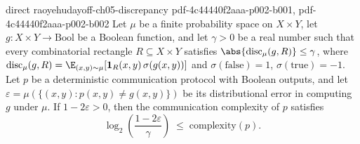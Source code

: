 \begin{theorem}
  {direct}
  {raoyehudayoff-ch05-discrepancy}
  {pdf-4c44440f2aaa-p002-b001,
    pdf-4c44440f2aaa-p002-b002}
Let $\mu$ be a finite probability space on $X \times Y$, let $g : X \times Y \to
\mathrm{Bool}$ be a Boolean function, and let $\gamma > 0$ be a real number such that
every combinatorial rectangle $R \subseteq X \times Y$ satisfies
$\abs{\mathrm{disc}_\mu(g, R)} \le \gamma$, where $\mathrm{disc}_\mu(g, R) =
\E_{(x,y)\sim\mu}[\mathbf{1}_R(x,y)\,\sigma(g(x,y))]$ and $\sigma(\mathrm{false}) = 1$,
$\sigma(\mathrm{true}) = -1$. Let $p$ be a deterministic communication protocol with
Boolean outputs, and let $\varepsilon = \mu(\{(x,y) : p(x,y) \ne g(x,y)\})$ be its
distributional error in computing $g$ under $\mu$. If $1 - 2\varepsilon > 0$, then the
communication complexity of $p$ satisfies
\[
  \log_2\!\left(\frac{1 - 2\varepsilon}{\gamma}\right) \;\le\; \mathrm{complexity}(p).
\]
\end{theorem}

